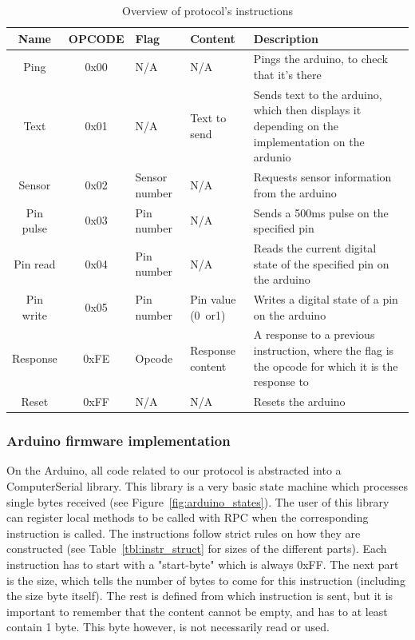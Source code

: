 \begin{table}[h!]
	\begin{tabular}{ | c | c | p{1.5cm} | p{1.7cm} | p{6cm} |}
		\hline
		\textbf{Name} & \textbf{OPCODE} & \textbf{Flag} & \textbf{Content} & \textbf{Description} \\
		\hline
		Ping & 0x00 & N/A & N/A & Pings the arduino, to check that it's there \\
		\hline
		Text & 0x01 & N/A & Text to send & Sends text to the arduino, which then displays it depending on the implementation on the ardunio \\
		\hline
		Sensor & 0x02 & Sensor number & N/A & Requests sensor information from the arduino \\
		\hline
		Pin pulse & 0x03 & Pin number & N/A & Sends a 500ms pulse on the specified pin \\
		\hline
		Pin read & 0x04 & Pin number & N/A & Reads the current digital state of the specified pin on the arduino \\
		\hline
		Pin write & 0x05 & Pin number & Pin value (0~or1) & Writes a digital state of a pin on the arduino \\
		\hline
		Response & 0xFE & Opcode & Response content & A response to a previous instruction, where the flag is the opcode for which it is the response to \\
		\hline
		Reset & 0xFF & N/A & N/A & Resets the arduino \\
		\hline
	\end{tabular}
	\caption{Overview of protocol's instructions}
	\label{tbl:opcodes}
\end{table}

\subsubsection{Arduino firmware implementation}
On the Arduino, all code related to our protocol is abstracted into a ComputerSerial library.
This library is a very basic state machine which processes single bytes received (see Figure~\ref{fig:arduino_states}).
The user of this library can register local methods to be called with RPC when the corresponding instruction is called.
The instructions follow strict rules on how they are constructed (see Table~\ref{tbl:instr_struct} for sizes of the different parts).
Each instruction has to start with a "start-byte" which is always 0xFF. The next part is the size, which tells the number of bytes
to come for this instruction (including the size byte itself). The rest is defined from which instruction is sent, but it is important to
remember that the content cannot be empty, and has to at least contain 1 byte. This byte however, is not necessarily read or used.

